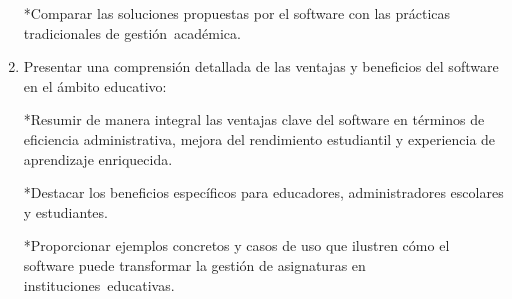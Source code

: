 \documentclass[11pt]{article}
\begin{document}
\begin{enumerate}
*Comparar las soluciones propuestas por el software con las prácticas tradicionales de gestión académica.

\item Presentar una comprensión detallada de las ventajas y beneficios del software en el ámbito educativo:

*Resumir de manera integral las ventajas clave del software en términos de eficiencia administrativa, mejora del rendimiento estudiantil y experiencia de aprendizaje enriquecida.


*Destacar los beneficios específicos para educadores, administradores escolares y estudiantes.


*Proporcionar ejemplos concretos y casos de uso que ilustren cómo el software puede transformar la gestión de asignaturas en
instituciones educativas.
\end{enumerate}
\end{document}
